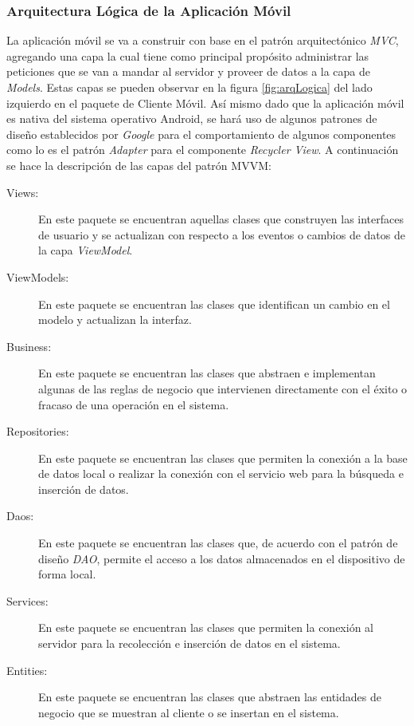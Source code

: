 \subsubsection{Arquitectura Lógica de la Aplicación Móvil}
La aplicación móvil se va a construir con base en el patrón arquitectónico \textit{MVC}, agregando una capa la cual tiene como principal propósito administrar las peticiones que se van a mandar al servidor y proveer de datos a la capa de \textit{Models}. Estas capas se pueden observar en la figura \ref{fig:arqLogica} del lado izquierdo en el paquete de Cliente Móvil. Así mismo dado que la aplicación móvil es nativa del sistema operativo Android, se hará uso de algunos patrones de diseño establecidos por \textit{Google} para el comportamiento de algunos componentes como lo es el patrón \textit{Adapter} para el componente \textit{Recycler View}. A continuación se hace la descripción de las capas del patrón MVVM:
	\begin{description}
		\item[Views:] En este paquete se encuentran aquellas clases que construyen las interfaces de usuario y se actualizan con respecto a los eventos o cambios de datos de la capa \textit{ViewModel}.
		\item[ViewModels:] En este paquete se encuentran las clases que identifican un cambio en el modelo y actualizan la interfaz.
		\item[Business:] En este paquete se encuentran las clases que abstraen e implementan algunas de las reglas de negocio que intervienen directamente con el éxito o fracaso de una operación en el sistema.
		\item[Repositories:] En este paquete se encuentran las clases que permiten la conexión a la base de datos local o realizar la conexión con el servicio web para la búsqueda e inserción de datos.
		\item[Daos:] En este paquete se encuentran las clases que, de acuerdo con el patrón de diseño \textit{DAO}, permite el acceso a los datos almacenados en el dispositivo de forma local.
		\item[Services:] En este paquete se encuentran las clases que permiten la conexión al servidor para la recolección e inserción de datos en el sistema.
		\item[Entities:] En este paquete se encuentran las clases que abstraen las entidades de negocio que se muestran al cliente o se insertan en el sistema.
	\end{description}


